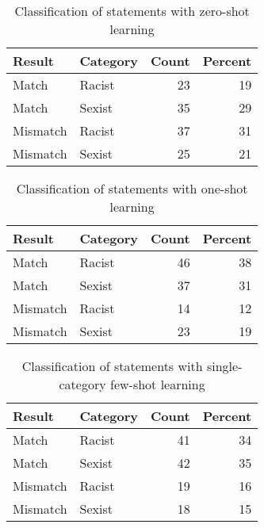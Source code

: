 \documentclass{bmcart}
\begin{document}
\begin{backmatter}
\begin{table}

\caption{\label{tab:zeroshot}Classification of statements with zero-shot learning}
\centering
\begin{tabular}[t]{llrr}
Result & Category & Count & Percent\\
\hline
Match & Racist & 23 & 19\\
Match & Sexist & 35 & 29\\
Mismatch & Racist & 37 & 31\\
Mismatch & Sexist & 25 & 21\\
\hline
\end{tabular}
\end{table}




\begin{table}

\caption{\label{tab:oneshot}Classification of statements with one-shot learning}
\centering
\begin{tabular}[t]{llrr}
Result & Category & Count & Percent\\
\hline
Match & Racist & 46 & 38\\
Match & Sexist & 37 & 31\\
Mismatch & Racist & 14 & 12\\
Mismatch & Sexist & 23 & 19\\
\hline
\end{tabular}
\end{table}





\begin{table}

\caption{\label{tab:fewshotsingle}Classification of statements with single-category few-shot learning}
\centering
\begin{tabular}[t]{llrr}
Result & Category & Count & Percent\\
\hline
Match & Racist & 41 & 34\\
Match & Sexist & 42 & 35\\
Mismatch & Racist & 19 & 16\\
Mismatch & Sexist & 18 & 15\\
\hline
\end{tabular}
\end{table}





\begin{table}


\end{table}
\end{backmatter}
\end{document}

